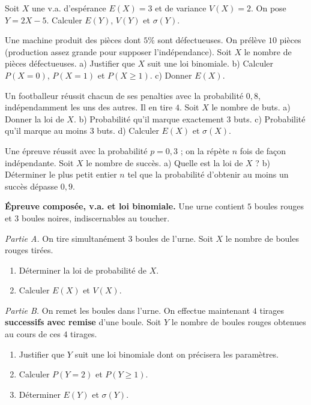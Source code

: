 \exo{} Soit $X$ une v.a. d'espérance $E(X)=3$ et de variance $V(X)=2$. On
pose $Y=2X-5$. Calculer $E(Y)$, $V(Y)$ et $\sigma(Y)$.

\exo{} Une machine produit des pièces dont $5\%$ sont défectueuses. On
prélève $10$ pièces (production assez grande pour supposer l'indépendance). Soit
$X$ le nombre de pièces défectueuses. a) Justifier que $X$ suit une loi binomiale.
b) Calculer $P(X{=}0)$, $P(X{=}1)$ et $P(X\ge1)$. c) Donner $E(X)$.

\exo{} Un footballeur réussit chacun de ses penalties avec la probabilité
$0{,}8$, indépendamment les uns des autres. Il en tire $4$. Soit $X$ le nombre de
buts. a) Donner la loi de $X$. b) Probabilité qu'il marque exactement $3$ buts.
c) Probabilité qu'il marque au moins $3$ buts. d) Calculer $E(X)$ et $\sigma(X)$.

\exo{} Une épreuve réussit avec la probabilité $p=0{,}3$ ; on la répète
$n$ fois de façon indépendante. Soit $X$ le nombre de succès. a) Quelle est la
loi de $X$ ? b) Déterminer le plus petit entier $n$ tel que la probabilité
d'obtenir au moins un succès dépasse $0{,}9$.

\exo{} \textbf{Épreuve composée, v.a. et loi binomiale.}
Une urne contient $5$ boules rouges et $3$ boules noires, indiscernables au
toucher.

\emph{Partie A.} On tire simultanément $3$ boules de l'urne. Soit $X$ le nombre
de boules rouges tirées.
\begin{enumerate}[label=\arabic*)]
\item Déterminer la loi de probabilité de $X$.
\item Calculer $E(X)$ et $V(X)$.
\end{enumerate}

\emph{Partie B.} On remet les boules dans l'urne. On effectue maintenant $4$
tirages \textbf{successifs avec remise} d'une boule. Soit $Y$ le nombre de boules
rouges obtenues au cours de ces $4$ tirages.
\begin{enumerate}[label=\arabic*),start=3]
\item Justifier que $Y$ suit une loi binomiale dont on précisera les paramètres.
\item Calculer $P(Y{=}2)$ et $P(Y\ge1)$.
\item Déterminer $E(Y)$ et $\sigma(Y)$.
\end{enumerate}

